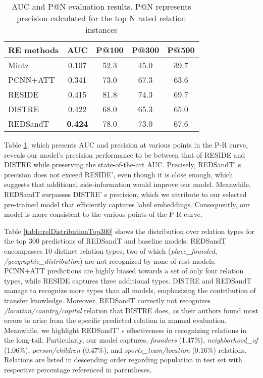 \documentclass[11pt,a4paper]{article}
\begin{document}
\begin{table}[t]
    \centering
    \begin{tabular}{@{} l  *4c @{}} 
    \toprule
     RE methods  & AUC & P@100 & P@300 & P@500\\
     \midrule
     Mintz  & 0.107 & 52.3 &  45.0 & 39.7\\
     PCNN+ATT & 0.341 & 73.0  & 67.3 & 63.6\\
     RESIDE & 0.415 & 81.8 & 74.3 & 69.7\\
     DISTRE & 0.422 & 68.0 & 65.3 & 65.0\\
     REDSandT & \textbf{0.424} & 78.0 & 73.0 & 67.6\\
    \bottomrule
    \end{tabular}
    \caption{AUC and P@N evaluation results. P@N represents precision calculated for the top N rated relation instances}
    \label{table:evalAgainstBaselines}
    \vspace{-9mm}
\end{table}
Table \ref{table:evalAgainstBaselines}, which presents AUC and precision at various points in the P-R curve, reveals our model's precision performance to be between that of RESIDE and DISTRE while preserving the state-of-the-art AUC. Precisely, REDSandT' s precision does not exceed RESIDE', even though it is close enough, which suggests that additional side-information would improve our model. Meanwhile, REDSandT surpasses DISTRE' s precision, which we attribute to our selected pre-trained model that efficiently captures label embeddings. Consequently, our model is more consistent to the various points of the P-R curve.

Table \ref{table:relDistributionTop300} shows the distribution over relation types for the top 300 predictions of REDSandT and baseline models. REDSandT encompasses 10 distinct relation types, two of which (\textit{place\_founded}, \textit{/geographic\_distribution}) are not recognized by none of rest models. PCNN+ATT predictions are highly biased towards a set of only four relation types, while RESIDE captures three additional types. DISTRE and REDSandT manage to recognize more types than all models, emphasizing the contribution of transfer knowledge. Moreover, REDSandT correctly not recognizes \textit{/location/country/capital} relation that DISTRE does, as their authors found most errors to arise from the specific predicted relation in manual evaluation. 
Meanwhile, we highlight REDSandT' s effectiveness in recognizing relations in the long-tail. Particularly, our model captures, \textit{founders} (1.47\%), \textit{neighborhood\_of} (1.06\%), \textit{person/children} (0.47\%), and \textit{sports\_team/location} (0.16\%) relations. Relations are listed in descending order regarding population in test set with respective percentage referenced in parentheses.
\end{document}
